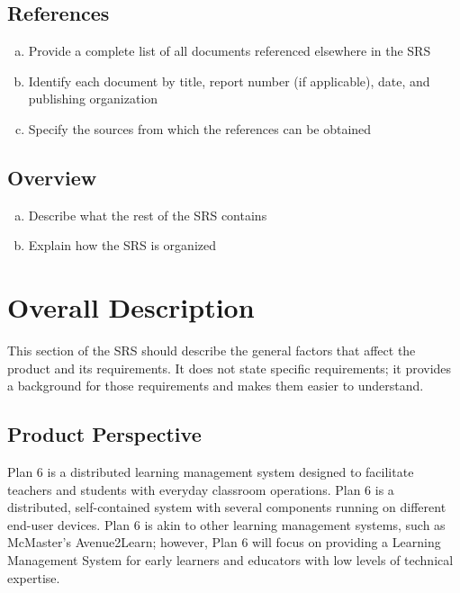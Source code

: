 \documentclass[]{article}
\begin{document}
\subsection{References}
\label{sub:references}
\begin{enumerate}[a)]
	\item Provide a complete list of all documents referenced elsewhere in the SRS
	\item Identify each document by title, report number (if applicable), date, and 
publishing organization
	\item Specify the sources from which the references can be obtained
\end{enumerate}

\subsection{Overview}
\label{sub:overview}
\begin{enumerate}[a)]
	\item Describe what the rest of the SRS contains
	\item Explain how the SRS is organized
\end{enumerate}


\section{Overall Description}
\label{sec:overall_description}

This section of the SRS should describe the general factors that affect the 
product and its requirements. It does not state specific requirements; it 
provides a background for those requirements and makes them easier to 
understand.

\subsection{Product Perspective}
\label{sub:product_perspective}
Plan 6 is a distributed learning management system designed to facilitate 
teachers and students with everyday classroom operations. Plan 6 is a 
distributed, self-contained system with several components running on different 
end-user devices. Plan 6 is akin to other learning management systems, such as 
McMaster's Avenue2Learn; however, Plan 6 will focus on providing a Learning 
Management System for early learners and educators with low levels of technical 
expertise. 
\end{document}
